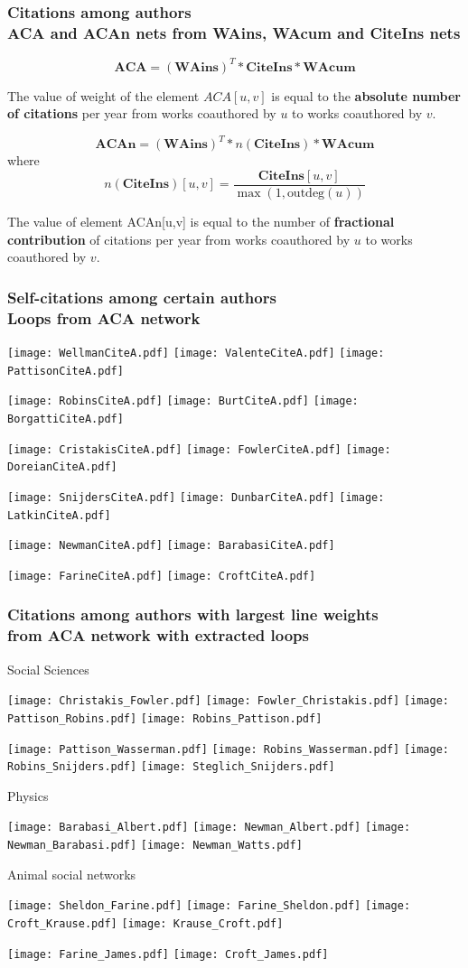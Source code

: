 \documentclass[hyperref={pdfstartview={FitBH -32768},
                         pdfpagemode=FullScreen,
                         plainpages=false,
                         colorlinks=true}
              ]{beamer}
\begin{document}
\begin{frame}[fragile]
\frametitle{Citations among authors \\ \normalsize ACA and ACAn nets from WAins, WAcum and CiteIns nets} 

\[ \mathbf{ACA} = (\mathbf{WAins}) ^ T * \mathbf{CiteIns} * \mathbf{WAcum} \] 

The value of weight of the element $ACA[u,v]$ is equal to the \textbf{absolute number of citations} per year from works coauthored by $u$ to works coauthored by $v$. \smallskip

\[ \mathbf{ACAn} = (\mathbf{WAins}) ^ T * n(\mathbf{CiteIns}) * \mathbf{WAcum} \]  
where 
\[ n(\mathbf{CiteIns})[u,v] = \frac {\mathbf{CiteIns}[u,v]}{\max(1,\textrm{outdeg}(u))}\]

The value of element ACAn[u,v] is equal to the number of \textbf{fractional contribution} of citations per year from works coauthored by $u$ to works coauthored by $v$.\smallskip

\end{frame}   

\begin{frame}[fragile]
\frametitle{Self-citations among certain authors \\ \normalsize Loops from ACA network} 
\centerline{
\texttt{[image: WellmanCiteA.pdf]}
\texttt{[image: ValenteCiteA.pdf]} 
\texttt{[image: PattisonCiteA.pdf]}} 
\centerline{
\texttt{[image: RobinsCiteA.pdf]} 
\texttt{[image: BurtCiteA.pdf]}
\texttt{[image: BorgattiCiteA.pdf]}} 
\centerline{
\texttt{[image: CristakisCiteA.pdf]} 
\texttt{[image: FowlerCiteA.pdf]} 
\texttt{[image: DoreianCiteA.pdf]}} 
\centerline{
\texttt{[image: SnijdersCiteA.pdf]} 
\texttt{[image: DunbarCiteA.pdf]} 
\texttt{[image: LatkinCiteA.pdf]}} 
\centerline{ 
\texttt{[image: NewmanCiteA.pdf]} 
\texttt{[image: BarabasiCiteA.pdf]}}
\centerline{
\texttt{[image: FarineCiteA.pdf]} 
\texttt{[image: CroftCiteA.pdf]}} 
\end{frame}    

\begin{frame}[fragile]
\frametitle{Citations among authors with largest line weights \\ \normalsize from ACA network with extracted loops} 
\footnotesize
Social Sciences \medskip  
\centerline{
\texttt{[image: Christakis\_Fowler.pdf]} 
\texttt{[image: Fowler\_Christakis.pdf]} 
\texttt{[image: Pattison\_Robins.pdf]}  
\texttt{[image: Robins\_Pattison.pdf]}} 
\centerline{
\texttt{[image: Pattison\_Wasserman.pdf]} 
\texttt{[image: Robins\_Wasserman.pdf]} 
\texttt{[image: Robins\_Snijders.pdf]} 
\texttt{[image: Steglich\_Snijders.pdf]}} \medskip 
Physics 
\centerline{
\texttt{[image: Barabasi\_Albert.pdf]} 
\texttt{[image: Newman\_Albert.pdf]} 
\texttt{[image: Newman\_Barabasi.pdf]} 
\texttt{[image: Newman\_Watts.pdf]}} \medskip 
Animal social networks 
\centerline{
\texttt{[image: Sheldon\_Farine.pdf]} 
\texttt{[image: Farine\_Sheldon.pdf]} 
\texttt{[image: Croft\_Krause.pdf]} 
\texttt{[image: Krause\_Croft.pdf]}} 
\centerline{
\texttt{[image: Farine\_James.pdf]} 
\texttt{[image: Croft\_James.pdf]}} 
\end{frame}    
\end{document}
